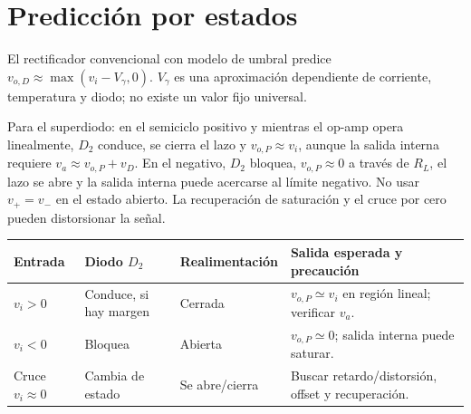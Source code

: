 \documentclass[10pt,a4paper]{article}
\begin{document}
\section{Predicción por estados}
El rectificador convencional con modelo de umbral predice $v_{o,D}\approx\max(v_i-V_\gamma,0)$. $V_\gamma$ es una aproximación dependiente de corriente, temperatura y diodo; no existe un valor fijo universal.

Para el superdiodo: en el semiciclo positivo y mientras el op-amp opera linealmente, $D_2$ conduce, se cierra el lazo y $v_{o,P}\approx v_i$, aunque la salida interna requiere $v_a\approx v_{o,P}+v_D$. En el negativo, $D_2$ bloquea, $v_{o,P}\approx0$ a través de $R_L$, el lazo se abre y la salida interna puede acercarse al límite negativo. No usar $v_+=v_-$ en el estado abierto. La recuperación de saturación y el cruce por cero pueden distorsionar la señal.
\begin{center}\begin{tabularx}{\linewidth}{@{}P{1.7cm}P{2cm}P{2.5cm}Y@{}}\toprule
Entrada & Diodo $D_2$ & Realimentación & Salida esperada y precaución \\ \midrule
$v_i>0$ & Conduce, si hay margen & Cerrada & $v_{o,P}\simeq v_i$ en región lineal; verificar $v_a$.\\
$v_i<0$ & Bloquea & Abierta & $v_{o,P}\simeq0$; salida interna puede saturar.\\
Cruce $v_i\approx0$ & Cambia de estado & Se abre/cierra & Buscar retardo/distorsión, offset y recuperación. \\ \bottomrule\end{tabularx}\end{center}
\end{document}
